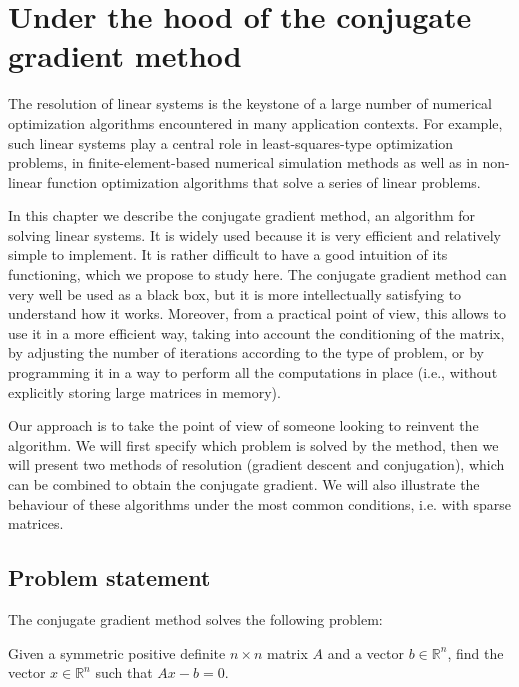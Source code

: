 \documentclass[notitlepage,oneside]{book}
\makeatletter
\newcommand{\authoredby}[1]{\addtocontents{toc}{\protect\@nameuse{authoredby#1}}}%
\makeatother
\begin{document}
\authoredby{A}
\chapter{Under the hood of the conjugate gradient method}
\fancyhead[R]{\textcolor{red}{optional for reading}}


The resolution of linear systems is the keystone of a large number of numerical optimization algorithms encountered in many application contexts.
For example, such linear systems play a central role in least-squares-type optimization problems, in
finite-element-based numerical simulation methods as well as in non-linear function optimization algorithms that solve a series of linear problems.

In this chapter we describe the conjugate gradient method, an algorithm for solving linear systems.
It is widely used because it is very efficient and relatively simple to implement.
It is rather difficult to have a good intuition of its functioning, which we propose to study here.
The conjugate gradient method can very well be used as a black box, but it is more intellectually satisfying to understand how it works.
Moreover, from a practical point of view, this allows to use it in a more efficient way, taking into account the conditioning of the matrix,
by adjusting the number of iterations according to the type of problem, or by programming it in a way to perform all the computations in place
(i.e., without explicitly storing large matrices in memory).

Our approach is to take the point of view of someone looking to reinvent the algorithm.
We will first specify which problem is solved by the method, then we will present two methods of resolution (gradient descent and conjugation), 
which can be combined to obtain the conjugate gradient.
We will also illustrate the behaviour of these algorithms under the most common conditions, i.e. with sparse matrices.



\section{Problem statement}

The conjugate gradient method solves the following problem:

\begin{framed}
Given  a symmetric positive definite $n\times n$ matrix $A$ and a vector $b \in {\mathbb R}^n$, find the vector $x \in {\mathbb R}^n$ such that $Ax - b =0$.
\end{framed}
\end{document}
